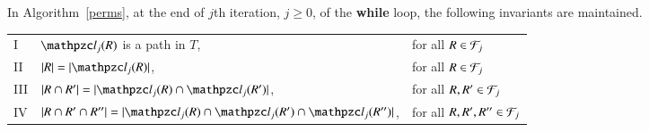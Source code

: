 \documentclass[MS,synopsis]{iitmdiss}
\begin{document}
\begin{lemma}
  \label{lem:invar1} In Algorithm~\ref{perms}, at the end of $j$th
  iteration, $j \ge 0$, of the {\bf while} loop, the following
  invariants are maintained.

  \begin{tabular}[h]{lll}
    I & $\cl_j(R)$ is a path in $T$, & for all $R \in {\cal F}_j$\\ 
    II  & $|R| = |\cl_j(R)|$, & for all $R \in {\cal F}_j$ \\ 
    III  & $|R \cap R'| = |\cl_j(R) \cap \cl_j(R')|$, & for all $R, R'
    \in {\cal F}_j$\\ 
    IV  & $|R \cap R' \cap R''|=|\cl_j(R) \cap \cl_j(R') \cap
    \cl_j(R'')|$, & for all $R, R', R'' \in {\cal F}_j$ 
  \end{tabular}
\end{lemma}

\end{document}
